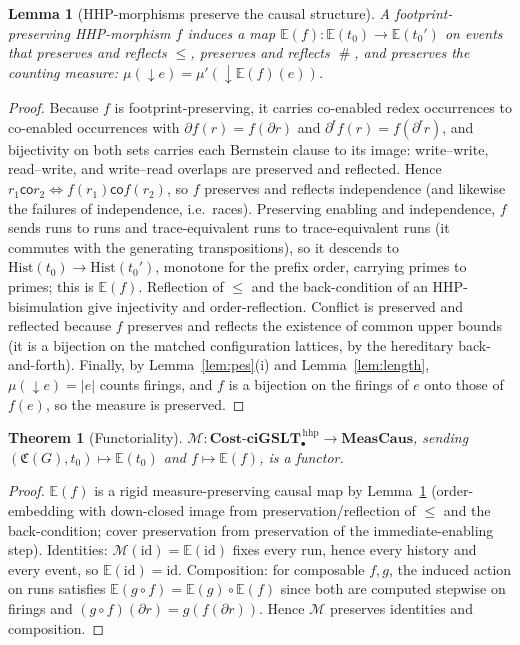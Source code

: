 \documentclass[11pt]{article}
\theoremstyle{definition}
\theoremstyle{plain}
\newtheorem{theorem}[definition]{Theorem}
\newtheorem{lemma}[definition]{Lemma}
\newcommand{\ciGSLT}{\mathbf{ciGSLT}}
\newcommand{\CostCp}{\mathbf{Cost}\text{-}\ciGSLT_{\bullet}}
\newcommand{\Cost}{\mathfrak{C}}
\newcommand{\id}{\mathrm{id}}
\newcommand{\foot}{\partial}                       %
\newcommand{\rfoot}{\partial^{\mathsf r}}          %
\newcommand{\Hist}{\mathrm{Hist}}
\newcommand{\Ev}{\mathbb{E}}
\newcommand{\dpast}[1]{{\downarrow}#1}
\newcommand{\MeasCaus}{\mathbf{MeasCaus}}
\newcommand{\Map}{\mathcal{M}}
\newcommand{\co}{\mathbin{\mathsf{co}}}            %
\newcommand{\confl}{\mathrel{\#}}                  %
\newcommand{\meas}{\mu}
\theoremstyle{remark}
\begin{document}
\begin{lemma}[HHP-morphisms preserve the causal structure]
\label{lem:preserve}
A footprint-preserving HHP-morphism $f$ induces a map
$\Ev(f) : \Ev(t_0) \to \Ev(t_0')$ on events that preserves and reflects
$\le$, preserves and reflects $\confl$, and preserves the counting
measure: $\meas(\dpast{e}) = \meas'(\dpast{\Ev(f)(e)})$.
\end{lemma}

\begin{proof}
Because $f$ is footprint-preserving, it carries co-enabled redex
occurrences to co-enabled occurrences with $\foot{f(r)} = f(\foot r)$ and
$\rfoot{f(r)} = f(\rfoot r)$, and bijectivity on both sets carries each
Bernstein clause to its image: write--write, read--write, and
write--read overlaps are preserved and reflected. Hence
$r_1 \co r_2 \iff f(r_1) \co f(r_2)$, so $f$ preserves and reflects
independence (and likewise the failures of independence, i.e.\ races).
Preserving enabling and independence, $f$
sends runs to runs and trace-equivalent runs to trace-equivalent runs
(it commutes with the generating transpositions), so it descends to
$\Hist(t_0) \to \Hist(t_0')$, monotone for the prefix order, carrying
primes to primes; this is $\Ev(f)$. Reflection of $\le$ and the
back-condition of an HHP-bisimulation give injectivity and order-reflection.
Conflict is preserved and reflected because $f$ preserves and reflects
the existence of common upper bounds (it is a bijection on the matched
configuration lattices, by the hereditary back-and-forth). Finally, by
Lemma~\ref{lem:pes}(i) and Lemma~\ref{lem:length}, $\meas(\dpast e) =
|e|$ counts firings, and $f$ is a bijection on the firings of $e$ onto
those of $f(e)$, so the measure is preserved.
\end{proof}

\begin{theorem}[Functoriality]
\label{thm:functor}
$\Map : \CostCp^{\,\mathrm{hhp}} \to \MeasCaus$, sending
$(\Cost(G),t_0) \mapsto \Ev(t_0)$ and $f \mapsto \Ev(f)$, is a functor.
\end{theorem}

\begin{proof}
$\Ev(f)$ is a rigid measure-preserving causal map by
Lemma~\ref{lem:preserve} (order-embedding with down-closed image from
preservation/reflection of $\le$ and the back-condition; cover
preservation from preservation of the immediate-enabling step).
Identities: $\Map(\id) = \Ev(\id)$ fixes every run, hence every history
and every event, so $\Ev(\id) = \id$. Composition: for composable $f, g$,
the induced action on runs satisfies $\Ev(g \circ f) = \Ev(g) \circ
\Ev(f)$ since both are computed stepwise on firings and
$(g\circ f)(\foot r) = g(f(\foot r))$. Hence $\Map$ preserves identities
and composition.
\end{proof}
\end{document}
